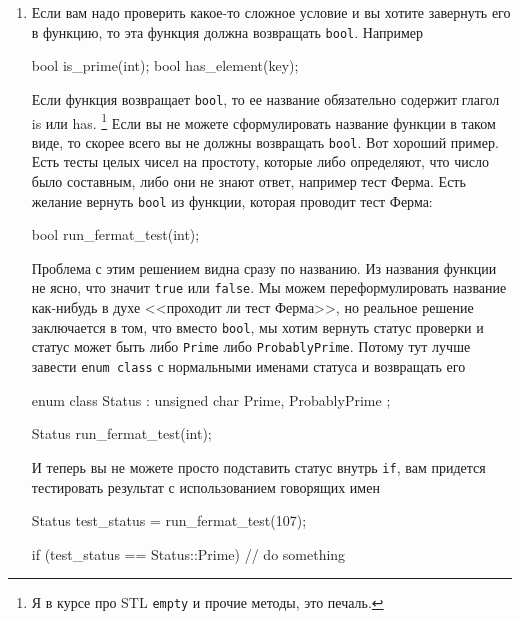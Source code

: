 \begin{enumerate}
\item Если вам надо проверить какое-то сложное условие и вы хотите завернуть его в функцию, то эта функция должна возвращать \verb"bool".
Например
\begin{cppcode}
bool is_prime(int);
bool has_element(key);
\end{cppcode}
Если функция возвращает \verb"bool", то ее название обязательно содержит глагол is или has.%
\footnote{Я в курсе про STL \verb"empty" и прочие методы, это печаль.}
Если вы не можете сформулировать название функции в таком виде, то скорее всего вы не должны возвращать \verb"bool".
Вот хороший пример.
Есть тесты целых чисел на простоту, которые либо определяют, что число было составным, либо они не знают ответ, например тест Ферма.
Есть желание вернуть \verb"bool" из функции, которая проводит тест Ферма:
\begin{cppcode}
bool run_fermat_test(int);
\end{cppcode}
Проблема с этим решением видна сразу по названию.
Из названия функции не ясно, что значит \verb"true" или \verb"false".
Мы можем переформулировать название как-нибудь в духе <<проходит ли тест Ферма>>, но реальное решение заключается в том, что вместо \verb"bool", мы хотим вернуть статус проверки и статус может быть либо \verb"Prime" либо \verb"ProbablyPrime".
Потому тут лучше завести \verb"enum class" с нормальными именами статуса и возвращать его
\begin{cppcode}
enum class Status : unsigned char {
  Prime, ProbablyPrime
};

Status run_fermat_test(int);
\end{cppcode}
И теперь вы не можете просто подставить статус внутрь \verb"if", вам придется тестировать результат с использованием говорящих имен
\begin{cppcode}
Status test_status = run_fermat_test(107);

if (test_status == Status::Prime)
  // do something
\end{cppcode}


\end{enumerate}
